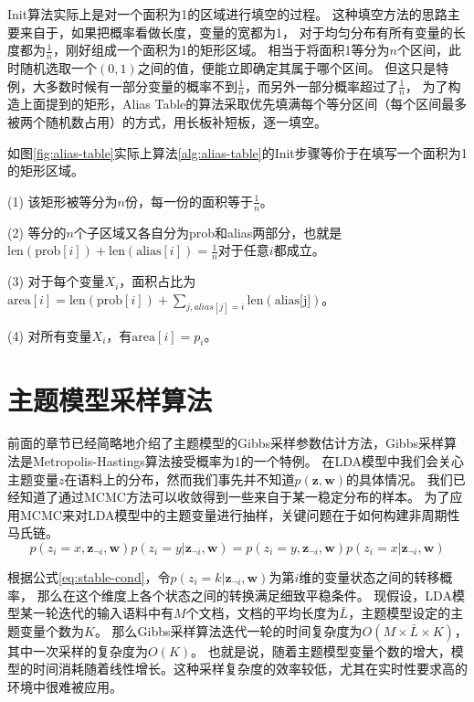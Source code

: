 Init算法实际上是对一个面积为1的区域进行填空的过程。
这种填空方法的思路主要来自于，如果把概率看做长度，变量的宽都为1，
对于均匀分布有所有变量的长度都为$\frac{1}{n}$，刚好组成一个面积为1的矩形区域。
相当于将面积1等分为$n$个区间，此时随机选取一个$(0, 1)$之间的值，便能立即确定其属于哪个区间。
但这只是特例，大多数时候有一部分变量的概率不到$\frac{1}{n}$，而另外一部分概率超过了$\frac{1}{n}$，
为了构造上面提到的矩形，Alias Table的算法采取优先填满每个等分区间（每个区间最多被两个随机数占用）的方式，用长板补短板，逐一填空。

如图\ref{fig:alias-table}实际上算法\ref{alg:alias-table}的Init步骤等价于在填写一个面积为1的矩形区域。

(1) 该矩形被等分为$n$份，每一份的面积等于$\frac{1}{n}$。

(2) 等分的$n$个子区域又各自分为prob和alias两部分，也就是$\mbox{len}(\mbox{prob}[i]) +\mbox{len}( \mbox{alias}[i]) = \frac{1}{n}$对于任意$i$都成立。

(3) 对于每个变量$X_i$，面积占比为$\mbox{area}[i] = \mbox{len}(\mbox{prob}[i]) + \sum_{j, alias[j]=i}{\mbox{len}(\mbox{alias[j]})}$。

(4) 对所有变量$X_i$，有$\mbox{area}[i] = p_i$。

\section{主题模型采样算法}
前面的章节已经简略地介绍了主题模型的Gibbs采样参数估计方法，Gibbs采样算法是Metropolis-Hastings算法接受概率为1的一个特例。
在LDA模型中我们会关心主题变量$z$在语料上的分布，然而我们事先并不知道$p\mathbf{ (z, w)}$的具体情况。
我们已经知道了通过MCMC方法可以收敛得到一些来自于某一稳定分布的样本。
为了应用MCMC来对LDA模型中的主题变量进行抽样，关键问题在于如何构建非周期性马氏链。
\begin{equation}
\label{eq:stable-cond}
p(z_i = x , \mathbf{z}_{\neg i}, \mathbf{w}) p( z_i = y | \mathbf{z}_{\neg i},  \mathbf{w})  =  
p(z_i = y , \mathbf{z}_{\neg i}, \mathbf{w}) p( z_i = x | \mathbf{z}_{\neg i},  \mathbf{w}) 
\end{equation}

根据公式\ref{eq:stable-cond}，令$p( z_i = k | \mathbf{z}_{\neg i},  \mathbf{w})$为第$i$维的变量状态之间的转移概率，
那么在这个维度上各个状态之间的转换满足细致平稳条件。
现假设，LDA模型某一轮迭代的输入语料中有$M$个文档，文档的平均长度为$\bar{L}$，主题模型设定的主题变量个数为$K$。
那么Gibbs采样算法迭代一轮的时间复杂度为$O(M\times \bar{L} \times K)$，其中一次采样的复杂度为$O(K)$。
也就是说，随着主题模型变量个数的增大，模型的时间消耗随着线性增长。这种采样复杂度的效率较低，尤其在实时性要求高的环境中很难被应用。


